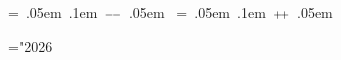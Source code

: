 \newbox\cwbb@decr		%
\setbox\cwbb@decr=\hbox{%
	    \kern .05em
	    \raise .1em \hbox{$\scriptstyle {-}\kern -.1em{-}$}%
	    \kern .05em
	    }
\newbox\cwbb@incr		%
\setbox\cwbb@incr=\hbox{%
	    \kern .05em
	    \raise .1em \hbox{$\scriptstyle {+}\kern -.1em{+}$}%
	    \kern .05em
	    }




\mathchardef\CwebAddress="2026	%
\let\CwebAssign==		%
\let\CwebBinOr=\mid		%
\def\CwebComplement{{\sim}}	%
\def\CwebDecr{\copy\cwbb@decr}	%
\def\CwebIncr{\copy\cwbb@incr}	%
\let\CwebLeftShift=\ll		%
\def\CwebMod{\mathbin{\hbox{\footnotesize\rm\%}}}	%
\def\CwebMemberRef{\mathbin{.*}}	%
\def\CwebPointer{\copy\cwbb@pointer}
\def\CwebPointerMemberRef{\mathbin{\CwebPointer*}} %
\def\CwebRel{\mathrel?}		%
\let\CwebRightShift=\gg		%
\def\CwebScope{\kern.1em{::}\kern.1em}	%

\def\CwebThis{\CwebRes{this}}	%



\def\TeX{%
    {%
	\ifmmode\it\fi
	\mbox{T\kern-.1667em\lower.424ex\hbox{E}\hskip-.125emX}%
    }}




